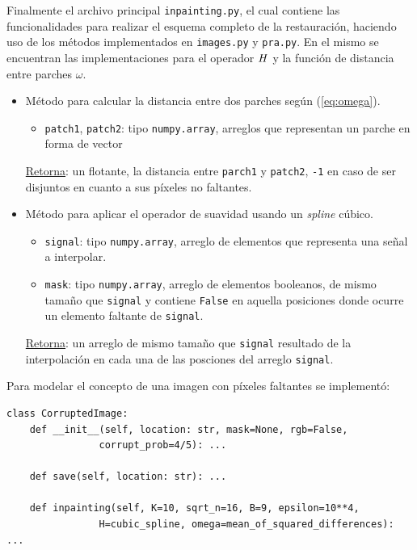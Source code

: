 Finalmente el archivo principal \texttt{inpainting.py}, el cual contiene las funcionalidades para realizar el esquema completo de la restauraci\'on, haciendo uso de los m\'etodos implementados en \texttt{images.py} y \texttt{pra.py}. En el mismo se encuentran las implementaciones para el operador $\mathit{H}$ y la funci\'on de distancia entre parches $\omega$.
\begin{itemize}
	\item M\'etodo para calcular la distancia entre dos parches seg\'un (\ref{eq:omega}).
	
	\begin{itemize}
		\item \texttt{patch1}, \texttt{patch2}: tipo \texttt{numpy.array}, arreglos que representan un parche en forma de vector
	\end{itemize}
	\underline{Retorna}: un flotante, la distancia entre \texttt{parch1} y \texttt{patch2}, \texttt{-1} en caso de ser disjuntos en cuanto a sus p\'ixeles no faltantes.
	
	\item M\'etodo para aplicar el operador de suavidad usando un \textit{spline} c\'ubico.
	
	\begin{itemize}
		\item \texttt{signal}: tipo \texttt{numpy.array}, arreglo de elementos que representa una señal a interpolar.
		\item \texttt{mask}: tipo \texttt{numpy.array}, arreglo de elementos booleanos, de mismo tamaño que \texttt{signal} y contiene \texttt{False} en aquella posiciones donde ocurre un elemento faltante de \texttt{signal}.
	\end{itemize}
	\underline{Retorna}: un arreglo de mismo tamaño que \texttt{signal} resultado de la interpolaci\'on en cada una de las posciones del arreglo \texttt{signal}.
\end{itemize}
Para modelar el concepto de una imagen con p\'ixeles faltantes se implement\'o:
\begin{lstlisting}
class CorruptedImage:
	def __init__(self, location: str, mask=None, rgb=False, 
				corrupt_prob=4/5): ...
	
	def save(self, location: str): ...
	
	def inpainting(self, K=10, sqrt_n=16, B=9, epsilon=10**4,
				H=cubic_spline, omega=mean_of_squared_differences): ...
\end{lstlisting}
